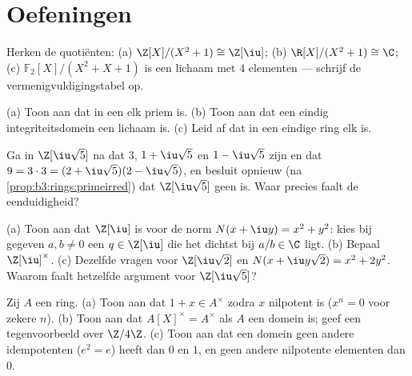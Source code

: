 \section{Oefeningen}

\begin{exercise}[$\star$]\label{exo:b3:rings:1}
Herken de quotiënten: (a) $\Z[X]/(X^2 + 1) \cong \Z[\iu]$;
(b) $\R[X]/(X^2+1) \cong \C$; (c) $\mathbb F_2[X]/(X^2 + X + 1)$ is
een lichaam met $4$ elementen --- schrijf de
vermenigvuldigingstabel op.
\end{exercise}

\begin{exercise}[$\star$]\label{exo:b3:rings:2}
(a) Toon aan dat in een  elk  priem is.
(b) Toon aan dat een eindig integriteitsdomein een lichaam is.
(c) Leid af dat in een eindige ring elk   is.
\end{exercise}

\begin{exercise}[$\star$]\label{exo:b3:rings:3}
Ga in $\Z[\iu\sqrt5]$ na dat $3$, $1 + \iu\sqrt5$ en $1 -
\iu\sqrt5$  zijn en dat $9 = 3\cdot 3 = (2 +
\iu\sqrt5)(2 - \iu\sqrt5)$, en besluit opnieuw (na
\cref{prop:b3:rings:primeirred}) dat $\Z[\iu\sqrt5]$ geen  is.
Waar precies faalt de eenduidigheid?
\end{exercise}

\begin{exercise}[$\star\star$]\label{exo:b3:rings:4}
(a) Toon aan dat $\Z[\iu]$  is voor de norm $N(x + \iu y)
= x^2 + y^2$: kies bij gegeven $a, b \neq 0$ een $q \in \Z[\iu]$
die het dichtst bij $a/b \in \C$ ligt.
(b) Bepaal $\Z[\iu]^\times$.
(c) Dezelfde vragen voor $\Z[\iu\sqrt2]$ en $N(x + \iu y\sqrt2) =
x^2 + 2y^2$. Waarom faalt hetzelfde argument voor
$\Z[\iu\sqrt5]$?
\end{exercise}

\begin{exercise}[$\star\star$]\label{exo:b3:rings:5}
Zij $A$ een ring. (a) Toon aan dat $1 + x \in A^\times$ zodra $x$
nilpotent is ($x^n = 0$ voor zekere $n$). (b) Toon aan dat
$A[X]^\times = A^\times$ als $A$ een domein is; geef een
tegenvoorbeeld over $\Z/4\Z$. (c) Toon aan dat een domein geen
andere idempotenten ($e^2 = e$) heeft dan $0$ en $1$, en geen
andere nilpotente elementen dan $0$.
\end{exercise}

